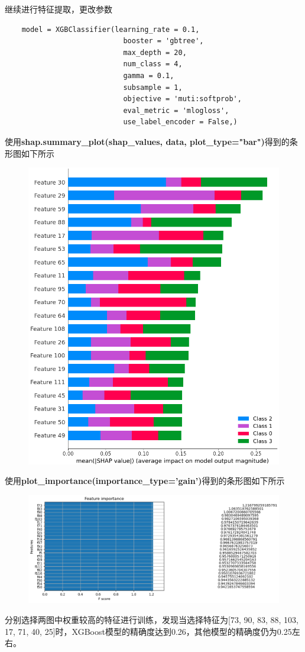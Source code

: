 \documentclass[12pt, a4paper, oneside]{ctexart}
\begin{document}
继续进行特征提取，更改参数
\begin{lstlisting}
    model = XGBClassifier(learning_rate = 0.1,
                            booster = 'gbtree',
                            max_depth = 20,
                            num_class = 4,
                            gamma = 0.1,
                            subsample = 1,
                            objective = 'muti:softprob',
                            eval_metric = 'mlogloss',
                            use_label_encoder = False,)
\end{lstlisting}
使用\textbf{shap.summary\_plot(shap\_values, data, plot\_type="bar")}得到的条形图如下所示
\begin{figure}[H]
    \centering
    \includegraphics[scale=0.6]{7.png}
\end{figure}
使用\textbf{plot\_importance(importance\_type='gain')}得到的条形图如下所示
\begin{figure}[H]
    \centering
    \includegraphics[scale=0.6]{8.png}
\end{figure}
分别选择两图中权重较高的特征进行训练，发现当选择特征为[73, 90, 83, 88, 103, 17, 71, 40, 25]时，XGBoost模型的精确度达到0.26，其他模型的精确度仍为0.25左右。
\end{document}
